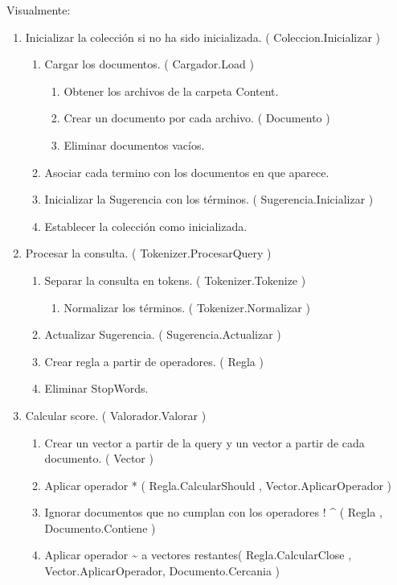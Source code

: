\documentclass{article}
\begin{document}
Visualmente:
\begin{enumerate}
  \item Inicializar la colección si no ha sido inicializada. ( Coleccion.Inicializar )
    \begin{enumerate}
      \item Cargar los documentos. ( Cargador.Load )
        \begin{enumerate}
          \item Obtener los archivos de la carpeta Content.
          \item Crear un documento por cada archivo. ( Documento )
          \item Eliminar documentos vacíos.
        \end{enumerate}
      \item Asociar cada termino con los documentos en que aparece.
      \item Inicializar la Sugerencia con los términos. ( Sugerencia.Inicializar )
      \item Establecer la colección como inicializada.
    \end{enumerate}
  \item Procesar la consulta. ( Tokenizer.ProcesarQuery )
    \begin{enumerate}
      \item Separar la consulta en tokens. ( Tokenizer.Tokenize )
        \begin{enumerate}
          \item Normalizar los términos. ( Tokenizer.Normalizar )
        \end{enumerate}
      \item Actualizar Sugerencia. ( Sugerencia.Actualizar )
      \item Crear regla a partir de operadores. ( Regla )
      \item Eliminar StopWords.
    \end{enumerate}
  \item Calcular score. ( Valorador.Valorar )
    \begin{enumerate}
      \item Crear un vector a partir de la query y un vector a partir de cada documento. ( Vector )
      \item Aplicar operador * ( Regla.CalcularShould , Vector.AplicarOperador )
      \item Ignorar documentos que no cumplan con los operadores ! \^{} (  Regla , Documento.Contiene )
      \item Aplicar operador \~{} a vectores restantes( Regla.CalcularClose , Vector.AplicarOperador, Documento.Cercania )

\end{enumerate}
\end{enumerate}
\end{document}
